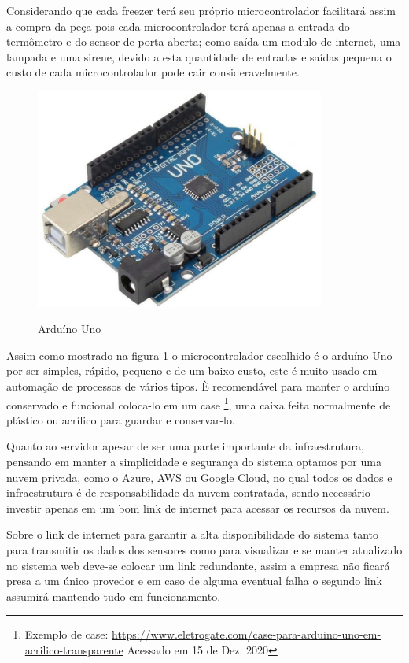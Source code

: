     Considerando que cada freezer terá seu próprio microcontrolador
    facilitará assim a compra da peça pois cada microcontrolador 
    terá apenas a entrada do termômetro e do sensor de porta aberta;
    como saída um modulo de internet, uma lampada e uma sirene, 
    devido a esta quantidade de entradas e saídas pequena o custo
    de cada microcontrolador pode cair consideravelmente.

    \begin{figure}[ht]
        \caption{Arduíno Uno}
        \centering
        \includegraphics[width=0.85\textwidth]{img/arduino_uno.jpg}
        \label{fig:arduinoUno}
    \end{figure}


    Assim como mostrado na figura \ref{fig:arduinoUno}
    o microcontrolador escolhido é o arduíno Uno
    por ser simples, rápido, pequeno e de um baixo custo,
    este é muito usado em automação de processos
    de vários tipos. È recomendável para manter o 
    arduíno conservado e funcional coloca-lo em um case
    \footnote{
        Exemplo de case: \url{https://www.eletrogate.com/case-para-arduino-uno-em-acrilico-transparente}
        Acessado em 15 de Dez. 2020
    },
    uma caixa feita normalmente de plástico ou acrílico 
    para guardar e conservar-lo.

    Quanto ao servidor apesar de ser uma parte importante 
    da infraestrutura, pensando em manter a simplicidade 
    e segurança do sistema optamos por uma nuvem privada,
    como o Azure, AWS ou Google Cloud, no qual todos os 
    dados e infraestrutura é de responsabilidade da 
    nuvem contratada, sendo necessário investir apenas 
    em um bom link de internet para acessar os recursos 
    da nuvem.

    Sobre o link de internet para garantir a 
    alta disponibilidade do sistema tanto 
    para transmitir os dados dos sensores 
    como para visualizar e se manter atualizado
    no sistema web deve-se colocar um link redundante,
    assim a empresa não ficará presa a um único provedor 
    e em caso de alguma eventual falha o segundo link 
    assumirá mantendo tudo em funcionamento.
